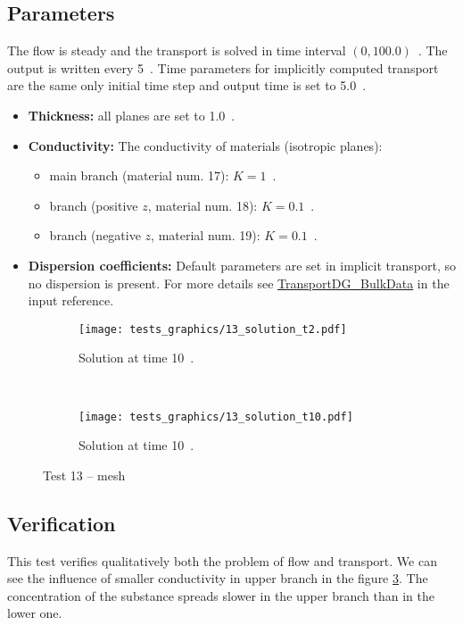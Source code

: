 \subsection*{Parameters}
The flow is steady and the transport is solved in time interval $(0,100.0)$~. 
The output is written every 5~. 
Time parameters for implicitly computed transport are the same only initial time step and output time is set to 5.0~.
\begin{itemize}
  \item \textbf{Thickness:} all planes are set to 1.0~.
  \item \textbf{Conductivity:} The conductivity of materials (isotropic planes):
    \begin{itemize}
      \item main branch (material num. 17): $K=1$~.
      \item branch (positive $z$, material num. 18): $K=0.1$~.
      \item branch (negative $z$, material num. 19): $K=0.1$~.
    \end{itemize}
  \item \textbf{Dispersion coefficients:} Default parameters are set in implicit transport, so no dispersion is present. 
        For more details see \hyperlink{IT::TransportDG-BulkData}{TransportDG\_BulkData} in the input reference.
\end{itemize}
%
\begin{figure}[!h]
    \centering
    \begin{subfigure}[b]{0.45\textwidth}
        \centering
        \texttt{[image: tests\_graphics/13\_solution\_t2.pdf]}
        \caption{Solution at time 10~.}
        \label{fig:test13_a}
    \end{subfigure}
    ~
    \begin{subfigure}[b]{0.45\textwidth}
        \centering
        \texttt{[image: tests\_graphics/13\_solution\_t10.pdf]}
        \caption{Solution at time 10~.}
        \label{fig:test13_b}
    \end{subfigure}
    \caption{Test 13 -- mesh}
  \label{fig:test13}
\end{figure}
%
\subsection*{Verification}
This test verifies qualitatively both the problem of flow and transport. We can see the influence of smaller conductivity 
in upper branch in the figure \ref{fig:test13}. The concentration of the substance spreads slower in the upper branch than 
in the lower one.

